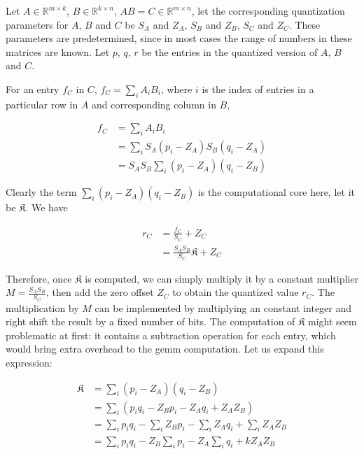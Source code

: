 Let $A \in \mathbb{R}^{m \times k}$, $B \in \mathbb{R}^{k \times n}$, $A B = C \in \mathbb{R}^{m \times n}$,
let the corresponding quantization parameters for $A$, $B$ and $C$ be $S_A$ and $Z_A$, $S_B$ and $Z_B$,
$S_C$ and $Z_C$. These parameters are predetermined, since in most cases the range of numbers in these matrices
are known. Let $p$, $q$, $r$ be the entries in the quantized version of $A$, $B$ and $C$. 

For an entry $f_C$ in $C$, $f_C = \sum_{i}^{} A_i B_i$, where $i$ is the index of entries in a particular
row in $A$ and corresponding column in $B$,

\begin{equation}
\begin{split}
  f_C & = \sum_{i} A_i B_i \\
      & = \sum_{i} S_A (p_i - Z_A) S_B (q_i - Z_A) \\
      & = S_A S_B \sum_{i} (p_i - Z_A) (q_i - Z_B)
\end{split}
\end{equation}

Clearly the term $\sum_{i} (p_i - Z_A) (q_i - Z_B)$ is the computational core here, let it be
$\mathfrak{K}$. We have

\begin{equation}
\begin{split}
  r_C & = \frac{f_C}{S_C} + Z_C \\
      & = \frac{S_A S_B}{S_C} \mathfrak{K} + Z_C
\end{split}
\end{equation}

Therefore, once $\mathfrak{K}$ is computed, we can simply multiply it by a constant multiplier
$M = \frac{S_A S_B}{S_C}$, then add the zero offset $Z_C$ to obtain the quantized value $r_C$. The
multiplication by $M$ can be implemented by multiplying an constant integer and right shift the
result by a fixed number of bits. The computation of $\mathfrak{K}$ might seem problematic at first:
it contains a subtraction operation for each entry,
which would bring extra overhead to the \gls{gemm} computation. Let us expand this expression:

\begin{equation}
\begin{split}
  \mathfrak{K} & = \sum_{i} (p_i - Z_A) (q_i - Z_B) \\
               & = \sum_{i} (p_i q_i - Z_B p_i - Z_A q_i + Z_A Z_B) \\
               & = \sum_{i} p_i q_i - \sum_{i} Z_B p_i - \sum_{i} Z_A q_i + \sum_{i} Z_A Z_B \\
               & = \sum_{i} p_i q_i - Z_B \sum_{i} p_i - Z_A \sum_{i} q_i + k Z_A Z_B
\end{split}
\end{equation}


